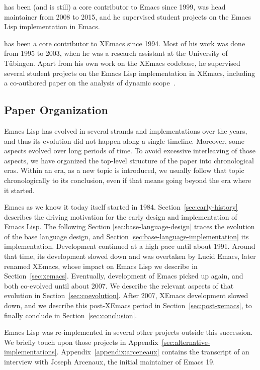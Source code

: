 \documentclass[format=acmsmall,screen]{acmart}
\newcommand \Elisp {Emacs Lisp}
\begin{document}
\smallskip

 has been (and is still) a core contributor to
Emacs since 1999, was head maintainer from 2008 to 2015, and he supervised
student projects on the \Elisp{} implementation in Emacs.

\smallskip

 has been a core contributor to XEmacs since 1994.
Most of his work was done from 1995 to 2003, when he was a research
assistant at the University of Tübingen.  Apart from his own work on
the XEmacs codebase, he supervised several student projects on the
\Elisp{} implementation in XEmacs, including a co-authored paper on the
analysis of dynamic scope~\cite{Neubauer01}.

\subsection{Paper Organization}

\Elisp{} has evolved in several strands and implementations over the
years, and thus its evolution did not happen along a single timeline.
Moreover, some aspects evolved over long periods of time.  To avoid
excessive interleaving of those aspects, we have organized the
top-level structure of the paper into chronological eras.  Within an
era, as a new topic is introduced, we usually follow that topic
chronologically to its conclusion, even if that means going beyond the
era where it started.

Emacs as we know it today itself started in 1984.
Section~\ref{sec:early-history} describes the driving motivation for
the early design and implementation of \Elisp.  The following Section
\ref{sec:base-language-design} traces the evolution of the base
language design, and Section \ref{sec:base-language-implementation}
its implementation.
Development continued at a high pace until about 1991.
Around that time, its development slowed down and
was overtaken by Lucid Emacs, later renamed XEmacs, whose impact on
\Elisp{} we describe in Section~\ref{sec:xemacs}.  Eventually,
development of Emacs picked up again, and both co-evolved until about
2007.  We describe the relevant aspects of that evolution in
Section~\ref{sec:coevolution}.  After 2007, XEmacs development slowed
down, and we describe this post-XEmacs period in
Section~\ref{sec:post-xemacs}, to finally conclude in
Section~\ref{sec:conclusion}.

\Elisp{} was re-implemented in several other projects outside this
succession.  We briefly touch upon those projects in
Appendix~\ref{sec:alternative-implementations}.
Appendix~\ref{appendix:arceneaux} contains the transcript of an
interview with Joseph Arcenaux, the initial maintainer of Emacs 19.
\end{document}
